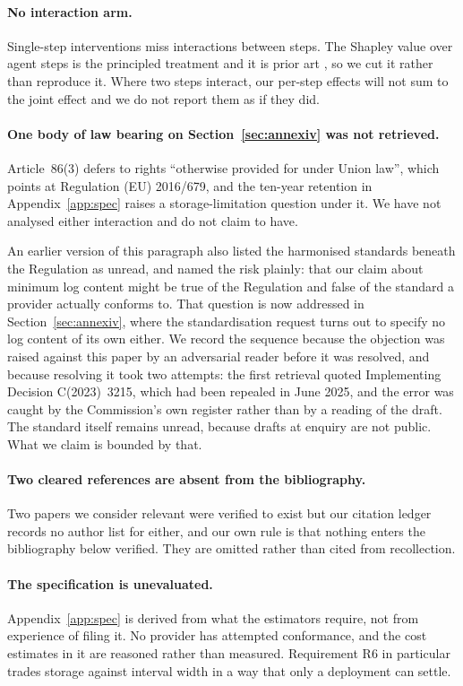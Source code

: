 \documentclass[11pt]{article}
\theoremstyle{remark}
\begin{document}
\paragraph{No interaction arm.} Single-step interventions miss interactions
between steps. The Shapley value over agent steps is the principled treatment and
it is prior art \citep{car2026,castro2009}, so we cut it rather than reproduce it.
Where two steps interact, our per-step effects will not sum to the joint effect
and we do not report them as if they did.

\paragraph{One body of law bearing on Section~\ref{sec:annexiv} was not
retrieved.} Article~86(3) defers to rights ``otherwise provided for under Union
law'', which points at Regulation (EU) 2016/679, and the ten-year retention in
Appendix~\ref{app:spec} raises a storage-limitation question under it. We have
not analysed either interaction and do not claim to have.

An earlier version of this paragraph also listed the harmonised standards beneath
the Regulation as unread, and named the risk plainly: that our claim about
minimum log content might be true of the Regulation and false of the standard a
provider actually conforms to. That question is now addressed in
Section~\ref{sec:annexiv}, where the standardisation request turns out to
specify no log content of its own either. We record the sequence because the
objection was raised against this paper by an adversarial reader before it was
resolved, and because resolving it took two attempts: the first retrieval quoted
Implementing Decision C(2023)~3215, which had been repealed in June 2025, and the
error was caught by the Commission's own register rather than by a reading of the
draft. The standard itself remains unread, because drafts at enquiry are not
public. What we claim is bounded by that.

\paragraph{Two cleared references are absent from the bibliography.} Two papers we
consider relevant were verified to exist but our citation ledger records no author
list for either, and our own rule is that nothing enters the bibliography below
verified. They are omitted rather than cited from recollection.

\paragraph{The specification is unevaluated.} Appendix~\ref{app:spec} is derived
from what the estimators require, not from experience of filing it. No provider
has attempted conformance, and the cost estimates in it are reasoned rather than
measured. Requirement R6 in particular trades storage against interval width in a
way that only a deployment can settle.
\end{document}
